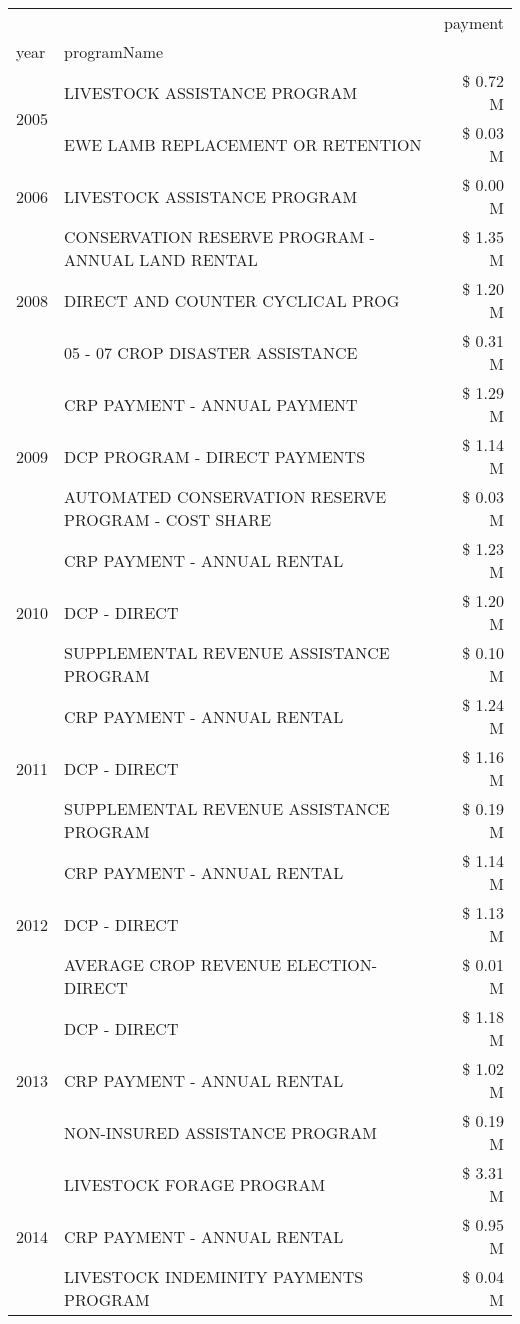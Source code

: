 \begin{tabular}{llr}
\toprule
 &  & payment \\
year & programName &  \\
\midrule
\multirow[t]{2}{*}{2005} & LIVESTOCK ASSISTANCE PROGRAM & \$ 0.72 M \\
 & EWE LAMB REPLACEMENT OR RETENTION & \$ 0.03 M \\
\cline{1-3}
2006 & LIVESTOCK ASSISTANCE PROGRAM & \$ 0.00 M \\
\cline{1-3}
\multirow[t]{3}{*}{2008} & CONSERVATION RESERVE PROGRAM - ANNUAL LAND RENTAL & \$ 1.35 M \\
 & DIRECT AND COUNTER CYCLICAL PROG & \$ 1.20 M \\
 & 05 - 07 CROP DISASTER ASSISTANCE & \$ 0.31 M \\
\cline{1-3}
\multirow[t]{3}{*}{2009} & CRP PAYMENT - ANNUAL PAYMENT & \$ 1.29 M \\
 & DCP PROGRAM - DIRECT PAYMENTS & \$ 1.14 M \\
 & AUTOMATED CONSERVATION RESERVE PROGRAM - COST SHARE & \$ 0.03 M \\
\cline{1-3}
\multirow[t]{3}{*}{2010} & CRP PAYMENT - ANNUAL RENTAL & \$ 1.23 M \\
 & DCP - DIRECT & \$ 1.20 M \\
 & SUPPLEMENTAL REVENUE ASSISTANCE PROGRAM & \$ 0.10 M \\
\cline{1-3}
\multirow[t]{3}{*}{2011} & CRP PAYMENT - ANNUAL RENTAL & \$ 1.24 M \\
 & DCP - DIRECT & \$ 1.16 M \\
 & SUPPLEMENTAL REVENUE ASSISTANCE PROGRAM & \$ 0.19 M \\
\cline{1-3}
\multirow[t]{3}{*}{2012} & CRP PAYMENT - ANNUAL RENTAL & \$ 1.14 M \\
 & DCP - DIRECT & \$ 1.13 M \\
 & AVERAGE CROP REVENUE ELECTION-DIRECT & \$ 0.01 M \\
\cline{1-3}
\multirow[t]{3}{*}{2013} & DCP - DIRECT & \$ 1.18 M \\
 & CRP PAYMENT - ANNUAL RENTAL & \$ 1.02 M \\
 & NON-INSURED ASSISTANCE PROGRAM & \$ 0.19 M \\
\cline{1-3}
\multirow[t]{3}{*}{2014} & LIVESTOCK FORAGE PROGRAM & \$ 3.31 M \\
 & CRP PAYMENT - ANNUAL RENTAL & \$ 0.95 M \\
 & LIVESTOCK INDEMINITY PAYMENTS PROGRAM & \$ 0.04 M \\

\end{tabular}
